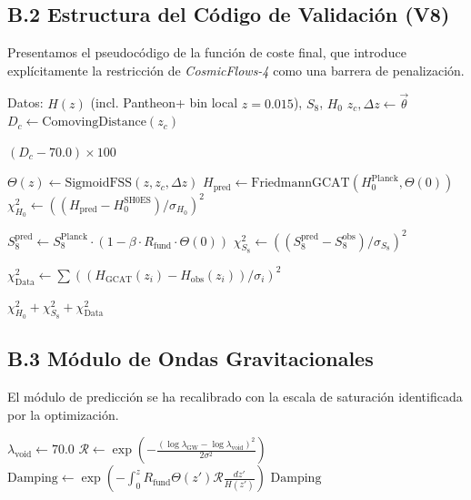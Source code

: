 \documentclass[12pt, a4paper]{article}
\theoremstyle{plain}
\theoremstyle{definition}
\begin{document}
\subsection{B.2 Estructura del Código de Validación (V8)}

Presentamos el pseudocódigo de la función de coste final, que introduce explícitamente la restricción de \textit{CosmicFlows-4} como una barrera de penalización.

\begin{algorithmic}[1]
\REQUIRE Datos: $H(z)$ (incl. Pantheon+ bin local $z=0.015$), $S_8$, $H_0$
    \STATE {}
    \STATE $z_c, \Delta z \gets \vec{\theta}$
    \STATE $D_c \gets \text{ComovingDistance}(z_c)$
    
    \STATE {}
        \STATE \RETURN $(D_c - 70.0) \times 100$ 
    \ENDIF
    
    \STATE {}
    \STATE $\Theta(z) \gets \text{SigmoidFSS}(z, z_c, \Delta z)$
    \STATE $H_{\text{pred}} \gets \text{FriedmannGCAT}(H_0^{\text{Planck}}, \Theta(0))$
    \STATE $\chi^2_{H_0} \gets ((H_{\text{pred}} - H_0^{\text{SH0ES}})/\sigma_{H_0})^2$
    
    \STATE {}
    \STATE $S_8^{\text{pred}} \gets S_8^{\text{Planck}} \cdot (1 - \beta \cdot R_{\text{fund}} \cdot \Theta(0))$
    \STATE $\chi^2_{S_8} \gets ((S_8^{\text{pred}} - S_8^{\text{obs}})/\sigma_{S_8})^2$
    
    \STATE {}
    \STATE $\chi^2_{\text{Data}} \gets \sum ((H_{\text{GCAT}}(z_i) - H_{\text{obs}}(z_i))/\sigma_i)^2$
    
    \RETURN $\chi^2_{H_0} + \chi^2_{S_8} + \chi^2_{\text{Data}}$
\ENDFUNCTION
\end{algorithmic}

\subsection{B.3 Módulo de Ondas Gravitacionales}

El módulo de predicción se ha recalibrado con la escala de saturación identificada por la optimización.

\begin{algorithmic}[1]
    \STATE $\lambda_{\text{void}} \gets 70.0$ 
    \STATE {}
    \STATE $\mathcal{R} \gets \exp\left(-\frac{(\log \lambda_{\text{GW}} - \log \lambda_{\text{void}})^2}{2\sigma^2}\right)$
    \STATE $\text{Damping} \gets \exp\left(-\int_0^z R_{\text{fund}} \Theta(z') \mathcal{R} \frac{dz'}{H(z')}\right)$
    \RETURN $\text{Damping}$
\ENDFUNCTION
\end{algorithmic}
\end{document}
